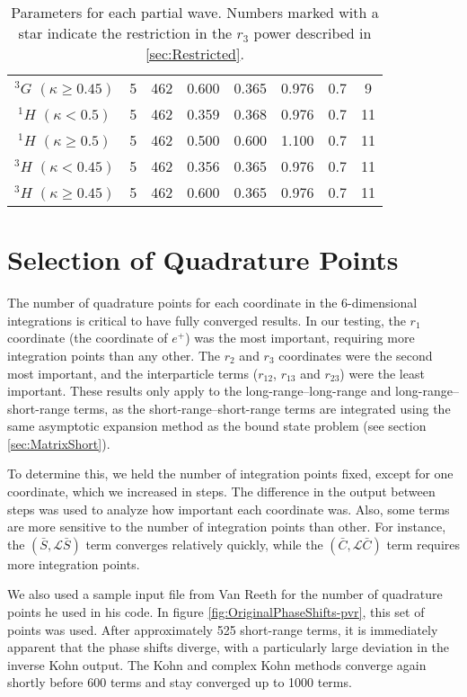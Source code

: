\documentclass[Dissertation.tex]{subfiles}
\begin{document}
\begin{table}[H]
\begin{tabular}{cclccccc}
    $^3G$ $(\kappa \geq 0.45)$ & 5 & 462         & 0.600 & 0.365 & 0.976 & 0.7 & 9 \\
	$^1H$ $(\kappa < 0.5)$     & 5 & 462         & 0.359 & 0.368 & 0.976 & 0.7 & 11 \\
	$^1H$ $(\kappa \geq 0.5)$  & 5 & 462         & 0.500 & 0.600 & 1.100 & 0.7 & 11 \\
	$^3H$ $(\kappa < 0.45)$    & 5 & 462         & 0.356 & 0.365 & 0.976 & 0.7 & 11 \\
    $^3H$ $(\kappa \geq 0.45)$ & 5 & 462         & 0.600 & 0.365 & 0.976 & 0.7 & 11 \\
	\bottomrule
  \end{tabular}
  \caption{Parameters for each partial wave. Numbers marked with a star indicate the
restriction in the $r_3$ power described in \cref{sec:Restricted}.}
  \label{tab:Nonlinear}
\end{table}	


\section{Selection of Quadrature Points}
\label{sec:SelQuadPoints1}
The number of quadrature points for each coordinate in the 6-dimensional integrations is critical to have fully converged results. In our testing, the $r_1$ coordinate (the coordinate of $e^+$) was the most important, requiring more integration points than any other. The $r_2$ and $r_3$ coordinates were the second most important, and the interparticle terms ($r_{12}$, $r_{13}$ and $r_{23}$) were the least important. These results only apply to the long-range--long-range and long-range--short-range terms, as the short-range--short-range terms are integrated using the same asymptotic expansion method as the bound state problem (see section \ref{sec:MatrixShort}).

To determine this, we held the number of integration points fixed, except for one coordinate, which we increased in steps. The difference in the output between steps was used to analyze how important each coordinate was. Also, some terms are more sensitive to the number of integration points than other. For instance, the $(\bar{S},\mathcal{L} \bar{S})$ term converges relatively quickly, while the $(\bar{C},\mathcal{L} \bar{C})$ term requires more integration points.

We also used a sample input file from Van Reeth for the number of quadrature points he used in his code. In figure \ref{fig:OriginalPhaseShifts-pvr}, this set of points was used. After approximately 525 short-range terms, it is immediately apparent that the phase shifts diverge, with a particularly large deviation in the inverse Kohn output. The Kohn and complex Kohn methods converge again shortly before 600 terms and stay converged up to 1000 terms.
\end{document}
